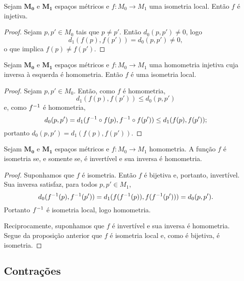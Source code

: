 \begin{proposition}
Sejam $\bm{M_0}$ e $\bm{M_1}$ espaços métricos e $f\colon M_0 \to M_1$ uma isometria local. Então $f$ é injetiva.
\end{proposition}
\begin{proof}
Sejam $p,p' \in M_0$ tais que $p \neq p'$. Então $d_0(p,p') \neq 0$, logo
	\begin{equation*}
	d_1(f(p),f(p')) = d_0(p,p') \neq 0,
	\end{equation*}
o que implica $f(p) \neq f(p')$.
\end{proof}

\begin{proposition}
Sejam $\bm{M_0}$ e $\bm{M_1}$ espaços métricos e $f\colon M_0 \to M_1$ uma homometria injetiva cuja inversa à esquerda é homometria. Então $f$ é uma isometria local.
\end{proposition}
\begin{proof}
Sejam $p,p' \in M_0$. Então, como $f$ é homometria,
	\begin{equation*}
	d_1(f(p),f(p')) \leq d_0(p,p')
	\end{equation*}
e, como $f^{-1}$ é homometria,
	\begin{equation*}
	d_0(p,p') = d_1(f^{-1} \circ f(p),f^{-1} \circ f(p')) \leq d_1(f(p),f(p'));
	\end{equation*}
portanto  $d_0(p,p') = d_1(f(p),f(p'))$.
\end{proof}

\begin{proposition}
Sejam $\bm{M_0}$ e $\bm{M_1}$ espaços métricos e $f\colon M_0 \to M_1$ homometria. A função $f$ é isometria se, e somente se, é invertível e sua inversa é homometria.
\end{proposition}
\begin{proof}
Suponhamos que $f$ é isometria. Então $f$ é bijetiva e, portanto, invertível. Sua inversa satisfaz, para todos $p,p' \in M_1$,
	\begin{equation*}
	d_0(f^{-1}(p),f^{-1}(p')) = d_1(f(f^{-1}(p)),f(f^{-1}(p'))) = d_0(p,p').
	\end{equation*}
Portanto $f^{-1}$ é isometria local, logo homometria.

Reciprocamente, suponhamos que $f$ é invertível e sua inversa é homometria. Segue da proposição anterior que $f$ é isometria local e, como é bijetiva, é isometria.
\end{proof}

\subsection{Contrações}

